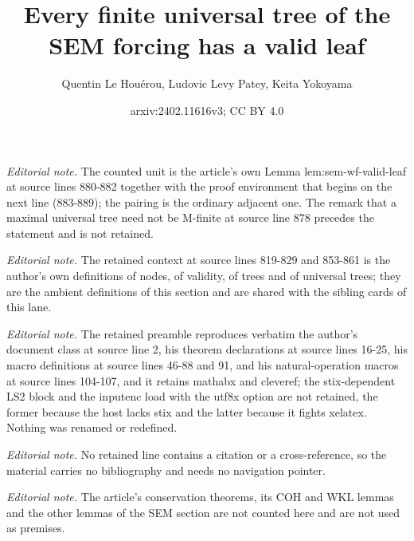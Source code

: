\documentclass{article}
\title{Every finite universal tree of the SEM forcing has a valid leaf}
\author{Quentin Le Houérou, Ludovic Levy Patey, Keita Yokoyama}
\date{arxiv:2402.11616v3; CC BY 4.0}
\numberwithin{theorem}{section}
\begin{document}
\maketitle
\noindent\textit{Editorial note.} The counted unit is the article's own Lemma lem:sem-wf-valid-leaf at source lines 880-882 together with the proof environment that begins on the next line (883-889); the pairing is the ordinary adjacent one. The remark that a maximal universal tree need not be M-finite at source line 878 precedes the statement and is not retained.\par\medskip
\noindent\textit{Editorial note.} The retained context at source lines 819-829 and 853-861 is the author's own definitions of nodes, of validity, of trees and of universal trees; they are the ambient definitions of this section and are shared with the sibling cards of this lane.\par\medskip
\noindent\textit{Editorial note.} The retained preamble reproduces verbatim the author's document class at source line 2, his theorem declarations at source lines 16-25, his macro definitions at source lines 46-88 and 91, and his natural-operation macros at source lines 104-107, and it retains mathabx and cleveref; the stix-dependent LS2 block and the inputenc load with the utf8x option are not retained, the former because the host lacks stix and the latter because it fights xelatex. Nothing was renamed or redefined.\par\medskip
\noindent\textit{Editorial note.} No retained line contains a citation or a cross-reference, so the material carries no bibliography and needs no navigation pointer.\par\medskip
\noindent\textit{Editorial note.} The article's conservation theorems, its COH and WKL lemmas and the other lemmas of the SEM section are not counted here and are not used as premises.\par\medskip
\end{document}

